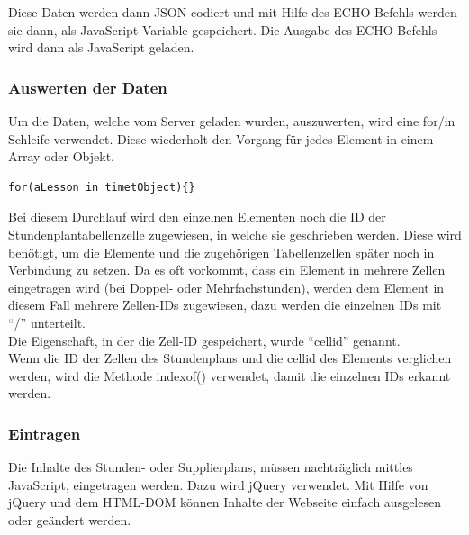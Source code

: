 Diese Daten werden dann JSON-codiert und mit Hilfe des ECHO-Befehls werden sie dann, als JavaScript-Variable gespeichert. Die Ausgabe des ECHO-Befehls wird dann als JavaScript geladen.

	


\subsubsection{Auswerten der Daten}

Um die Daten, welche vom Server geladen wurden, auszuwerten, wird eine for/in Schleife verwendet. Diese wiederholt den Vorgang für jedes Element in einem Array oder Objekt.

\begin{lstlisting}
for(aLesson in timetObject){}
\end{lstlisting}

Bei diesem Durchlauf wird den einzelnen Elementen noch die ID der Stundenplantabellenzelle zugewiesen, in welche sie geschrieben werden. Diese wird benötigt, um die Elemente und die zugehörigen Tabellenzellen später noch in Verbindung zu setzen. Da es oft vorkommt, dass ein Element in mehrere Zellen eingetragen wird (bei Doppel- oder Mehrfachstunden), werden dem Element in diesem Fall mehrere Zellen-IDs zugewiesen, dazu werden die einzelnen IDs mit \enquote{/} unterteilt.\\
Die Eigenschaft, in der die Zell-ID gespeichert, wurde \enquote{cellid} genannt.\\



Wenn die ID der Zellen des Stundenplans und die cellid des Elements verglichen werden, wird die Methode indexof() verwendet, damit die einzelnen IDs erkannt werden.\\



\subsubsection{Eintragen}

Die Inhalte des Stunden- oder Supplierplans, müssen nachträglich mittles JavaScript, eingetragen werden. Dazu wird jQuery verwendet. Mit Hilfe von jQuery und dem HTML-DOM können Inhalte der Webseite einfach ausgelesen oder geändert werden.

